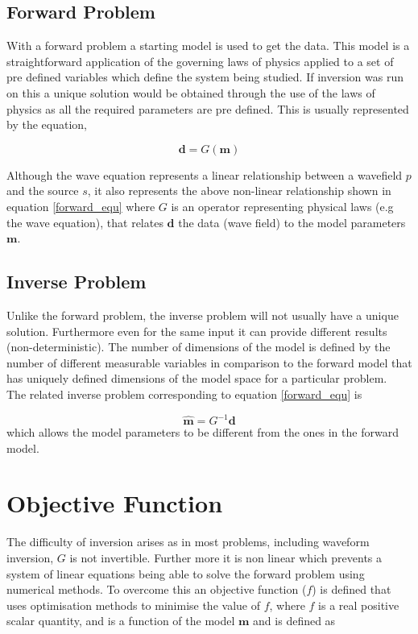 \subsection{Forward Problem}

With a forward problem a starting model is used to get the data. This model is a straightforward application of the governing laws of physics applied to a set of pre defined variables which define the system being studied. If inversion was run on this a unique solution would be obtained through the use of the laws of physics as all the required parameters are pre defined. 
This is usually represented by the equation, 

\begin{equation} 
\textbf{d} = G(\textbf{m})
\label{forward_equ}
\end{equation}

Although the wave equation represents a linear relationship between a wavefield $p$ and the source $s$, it also represents the above non-linear relationship shown in equation \ref{forward_equ} where $G$ is an operator representing physical laws (e.g the wave equation), that relates $\textbf{d}$ the data (wave field) to the model parameters $\textbf{m}$. 

\subsection{Inverse Problem}
Unlike the forward problem, the inverse problem  will not usually have a unique solution. Furthermore even for the same input it can provide different results (non-deterministic). The number of dimensions of the model is defined by the number of different measurable variables in comparison to the forward model that has uniquely defined dimensions of the model space for a particular problem. \\
The related inverse problem corresponding to equation \ref{forward_equ} is 

\begin{equation}
\hat{\textbf{m}} = G^{-1}\textbf{d} 
\label{Inverse_equ}
\end{equation}
which allows the model parameters to be different from the ones in the forward model. 

\section{Objective Function}
The difficulty of inversion arises as in most problems, including waveform inversion, $G$ is not invertible. Further more it is non linear which prevents a system of linear equations being able to solve the forward problem using numerical methods. To overcome this an objective function ($f$) is defined that uses optimisation methods to minimise the value of $f$, where $f$ is a real positive scalar quantity, and is a function of the model $\mathbf{m}$ and is defined as

